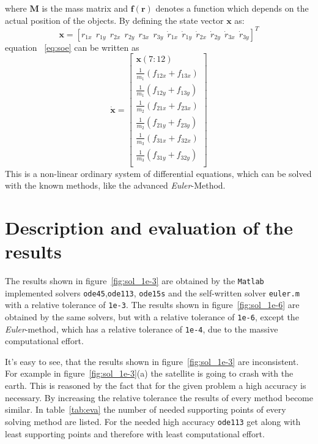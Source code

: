 \documentclass[11pt,a4paper,oneside]{scrartcl}
\begin{document}
where $\boldsymbol{M}$ is the mass matrix and  $\boldsymbol{f}(\boldsymbol{r})$ denotes a function which depends on the actual position of the objects. By defining the state vector $\boldsymbol{x}$ as:
$$
\boldsymbol{x} = \left[ r_{1x} ~~ r_{1y} ~~ r_{2x} ~~ r_{2y} ~~ r_{3x} ~~ r_{3y} ~~ \dot{r}_{1x} ~~ \dot{r}_{1y} ~~ \dot{r}_{2x}  ~~ \dot{r}_{2y} ~~ \dot{r}_{3x} ~~ \dot{r}_{3y} \right]^T
$$
equation ~\ref{eq:soe} can be written as
\begin{equation}
\dot{\boldsymbol{x}}
=
\left[
\begin{matrix}
\boldsymbol{x}(7:12) \\
\frac{1}{m_1} \left( f_{12x} + f_{13x} \right) \\
\frac{1}{m_1} \left( f_{12y} + f_{13y} \right) \\
\frac{1}{m_2} \left( f_{21x} + f_{23x} \right) \\
\frac{1}{m_2} \left( f_{21y} + f_{23y} \right) \\
\frac{1}{m_3} \left( f_{31x} + f_{32x} \right) \\
\frac{1}{m_3} \left( f_{31y} + f_{32y} \right) \\
\end{matrix}
\right]
\label{eq:ode}
\end{equation}
This is a non-linear ordinary system of differential equations, which can be solved with the known methods, like the advanced \textit{Euler}-Method.

\section{Description and evaluation of the results}

The results shown in figure~\ref{fig:sol_1e-3} are obtained by the \texttt{Matlab} implemented solvers \texttt{ode45},\texttt{ode113}, \texttt{ode15s} and the self-written solver \texttt{euler.m} with a relative tolerance of \texttt{1e-3}. The results shown in figure~\ref{fig:sol_1e-6} are obtained by the same solvers, but with a relative tolerance of \texttt{1e-6}, except the \textit{Euler}-method, which has a relative tolerance of \texttt{1e-4}, due to the massive computational effort.

It's easy to see, that the results shown in figure~\ref{fig:sol_1e-3} are inconsistent. For example in figure~\ref{fig:sol_1e-3}(a) the satellite is going to crash with the earth. This is reasoned by the fact that for the given problem a high accuracy is necessary. By increasing the relative tolerance the results of every method become similar. In table~\ref{tab:eva} the number of needed supporting points of every solving method are listed. For the needed high accuracy \texttt{ode113} get along with least supporting points and therefore with least computational effort.
\end{document}
